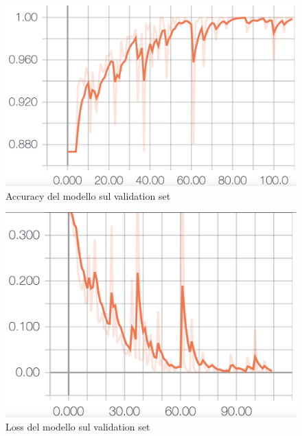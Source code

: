 \documentclass[8pt,notitlepage]{report}
\begin{document}
			\begin{figure}[H]
				\begin{center}
					\includegraphics[scale=.1865]{val_acc_Antonio}
					\caption{Accuracy del modello sul validation set}
				\end{center}
			\end{figure}
			
			\begin{figure}[H]
				\begin{center}
					\includegraphics[scale=.1865]{val_loss_Antonio}
					\caption{Loss del modello sul validation set}
				\end{center}
			\end{figure}
			
\end{document}
